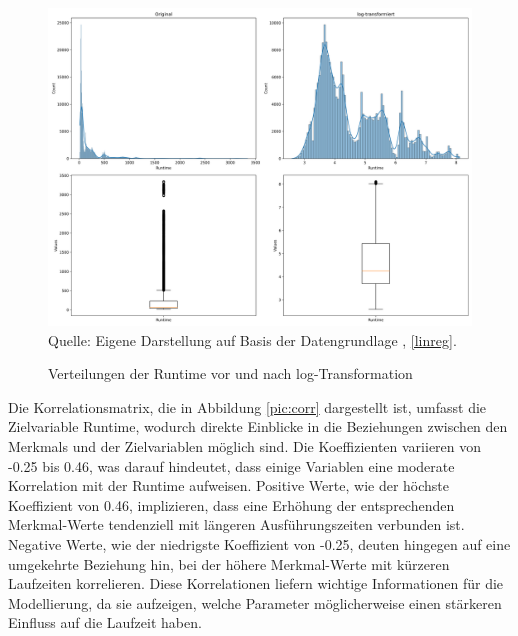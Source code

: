 \begin{figure}[!h]
    \caption{Verteilungen der Runtime vor und nach log-Transformation}
    \includegraphics[width=1\textwidth]{../scripts/images/combined_runtime_plots.png}
    Quelle: Eigene Darstellung auf Basis der Datengrundlage \cite{misc_sgemm_gpu_kernel_performance_440}, \ref{linreg}.
    \label{pic:box}
\end{figure}

Die Korrelationsmatrix, die in Abbildung \ref{pic:corr} dargestellt ist, 
umfasst die Zielvariable Runtime, wodurch direkte Einblicke in die Beziehungen 
zwischen den Merkmals und der Zielvariablen möglich sind. Die Koeffizienten variieren 
von -0.25 bis 0.46, was darauf hindeutet, dass einige Variablen eine moderate 
Korrelation mit der Runtime aufweisen. Positive Werte, wie der höchste Koeffizient 
von 0.46, implizieren, dass eine Erhöhung der entsprechenden Merkmal-Werte tendenziell 
mit längeren Ausführungszeiten verbunden ist. Negative Werte, wie der niedrigste Koeffizient 
von -0.25, deuten hingegen auf eine umgekehrte Beziehung hin, 
bei der höhere Merkmal-Werte mit kürzeren Laufzeiten korrelieren. 
Diese Korrelationen liefern wichtige Informationen für die Modellierung, da sie aufzeigen, 
welche Parameter möglicherweise einen stärkeren Einfluss auf die Laufzeit haben. 

